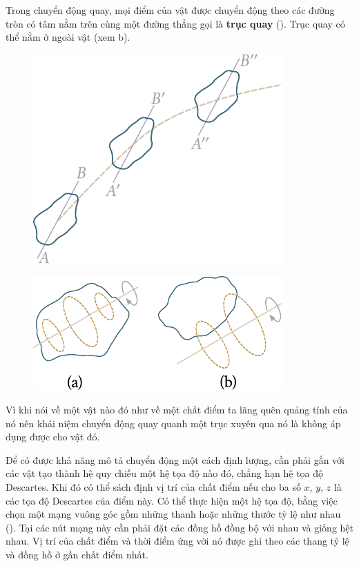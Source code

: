 Trong chuyển động quay, mọi điểm của vật được chuyển động theo các đường tròn có tâm nằm trên cùng một đường thẳng gọi là \textbf{trục quay} (). Trục quay có thể nằm ở ngoài vật (xem b).

\begin{figure}[!htb]
	\begin{minipage}[t]{0.5\linewidth}
		\begin{center}
			\includegraphics[scale=0.95]{figures/ch_01/fig_1_1.pdf}
			\caption[]{}
			\label{fig:1_1}
		\end{center}
	\end{minipage}
	\hfill{ }%
	\begin{minipage}[t]{0.5\linewidth}
		\begin{center}
			\includegraphics[scale=0.95]{figures/ch_01/fig_1_2.pdf}
			\caption[]{}
			\label{fig:1_2}
		\end{center}
	\end{minipage}
\end{figure}

Vì khi nói về một vật nào đó như về một chất điểm ta lãng quên quảng tính của nó nên khái niệm chuyển động quay quanh một trục xuyên qua nó là không áp dụng được cho vật đó.

Để có được khả năng mô tả chuyển động một cách định lượng, cần phải gắn với các vật tạo thành hệ quy chiếu một hệ tọa độ nào đó, chẳng hạn hệ tọa độ Descartes. Khi đó có thể sách định vị trí của chất điểm nếu cho ba số $x$, $y$, $z$ là các tọa độ Descartes của điểm này. Có thể thực hiện một hệ tọa độ, bằng việc chọn một mạng vuông góc gồm những thanh hoặc những thước tỷ lệ như nhau (). Tại các nút mạng này cần phải đặt các đồng hồ đồng bộ với nhau và giống hệt nhau. Vị trí của chất điểm và thời điểm ứng với nó được ghi theo các thang tỷ lệ và đồng hồ ở gần chất điểm nhất.

